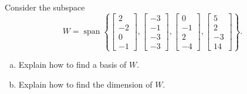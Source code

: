 
\begin{exerciseStatement}


Consider the subspace \[W=\operatorname{span}  \left\{ \left[\begin{array}{c}
2 \\
-2 \\
0 \\
-1
\end{array}\right] , \left[\begin{array}{c}
-3 \\
-1 \\
-3 \\
-3
\end{array}\right] , \left[\begin{array}{c}
0 \\
-1 \\
2 \\
-4
\end{array}\right] , \left[\begin{array}{c}
5 \\
2 \\
-3 \\
14
\end{array}\right] \right\} .\]


\begin{enumerate}[(a)]
\item  Explain how to find a basis of \(W\).
\item  Explain how to find the dimension of \(W\).
\end{enumerate}
    
\end{exerciseStatement}
    

